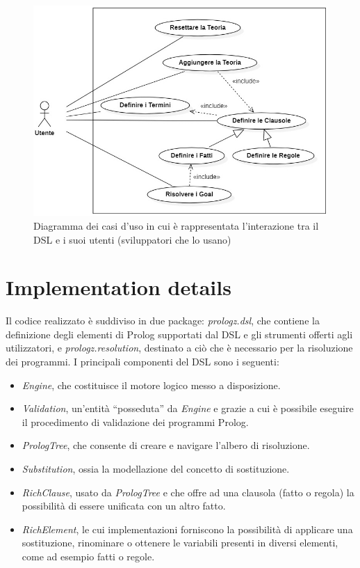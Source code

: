 \begin{figure}[th]
\centering
\includegraphics[scale=0.79]{images/DiagramUseCase}
\decoRule
\caption[DiagramUseCase]{Diagramma dei casi d'uso in cui è rappresentata l'interazione tra il DSL e i suoi utenti (sviluppatori che lo usano)}
\end{figure}


\section{Implementation details}

Il codice realizzato è suddiviso in due package: \textit{prologz.dsl}, che contiene la definizione degli elementi di Prolog supportati dal DSL e gli strumenti offerti agli utilizzatori, e \textit{prologz.resolution}, destinato a ciò che è necessario per la risoluzione dei programmi. I principali componenti del DSL sono i seguenti:

\begin{itemize}
\item \textit{Engine}, che costituisce il motore logico messo a disposizione.
\item \textit{Validation}, un'entità ``posseduta'' da \textit{Engine} e grazie a cui è possibile eseguire il procedimento di validazione dei programmi Prolog.
\item \textit{PrologTree}, che consente di creare e navigare l'albero di risoluzione.
\item \textit{Substitution}, ossia la modellazione del concetto di sostituzione.
\item \textit{RichClause}, usato da \textit{PrologTree} e che offre ad una clausola (fatto o regola) la possibilità di essere unificata con un altro fatto.
\item \textit{RichElement}, le cui implementazioni forniscono la possibilità di applicare una sostituzione, rinominare o ottenere le variabili presenti in diversi elementi, come ad esempio fatti o regole.
\end{itemize}

